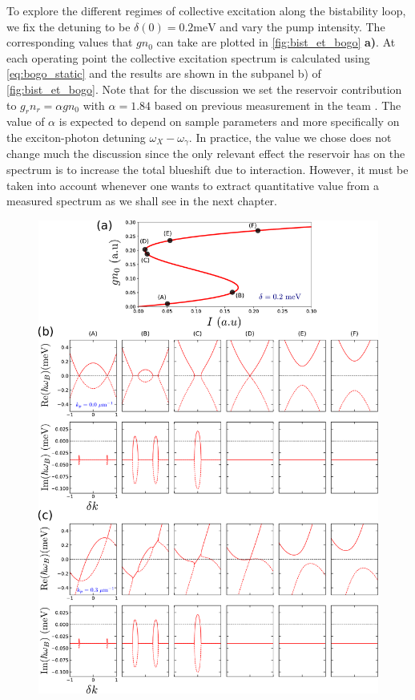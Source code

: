 To explore the different regimes of collective excitation along the bistability loop, we fix the detuning to be $\delta(0)=0.2 \mathrm{meV}$ and vary the pump intensity. The corresponding
values that $gn_0$ can take are plotted in \autoref{fig:bist_et_bogo} \textbf{a)}. At each operating point the collective excitation spectrum is calculated using \autoref{eq:bogo_static} and the results are shown in the subpanel b) of \autoref{fig:bist_et_bogo}.
Note that for the discussion we set the reservoir contribution to $g_rn_r=\alpha gn_0$ with $\alpha=1.84$ based on previous measurement in the team \cite{claude_phd}. The value of $\alpha$ is expected to depend on sample parameters and more specifically on the exciton-photon detuning $\omega_X-\omega_\gamma$. In practice, the value we chose does not change much the discussion since the only relevant effect the reservoir has on the spectrum is to increase the total blueshift 
due to interaction. However, it must be taken into account whenever one wants to extract quantitative value from a measured spectrum as we shall see in the next chapter.
\begin{figure}[!htbp]
    \centering
    \includegraphics[width=1\textwidth]{chap_AG_theory/fig/bist_et_bogo.pdf}
\end{figure}
